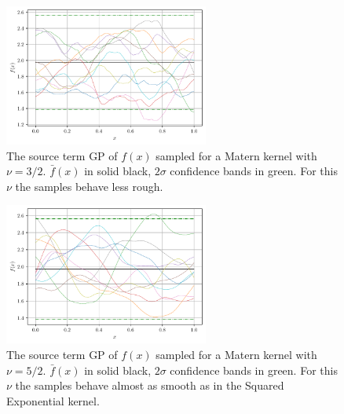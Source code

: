 \documentclass[%
  a4paper,oneside,%
  11pt,%
  smallchapters,
  style=printdev,
  extramargin,
  green,%
  rgb, <cmyk>
  ]{tubsbook}
\begin{document}
\begin{figure}[!ht]
\begin{center}

\includegraphics[width=0.6\textwidth]{pics/matern3_2_f_sampled}
\caption{The source term GP of $f(x)$ sampled for a Matern kernel with $\nu=3/2$. $\bar{f}(x)$ in solid black, $2\sigma$ confidence bands in green. For this $\nu$ the samples behave less rough.}
\label{fig:Matern3_2}

\end{center}
\end{figure}

\begin{figure}[!ht]
\begin{center}

\includegraphics[width=0.6\textwidth]{pics/matern5_2_f_sampled}
\caption{The source term GP of $f(x)$ sampled for a Matern kernel with $\nu=5/2$. $\bar{f}(x)$ in solid black, $2\sigma$ confidence bands in green. For this $\nu$ the samples behave almost as smooth as in the Squared Exponential kernel.}
\label{fig:Matern5_2}

\end{center}
\end{figure}
\end{document}
